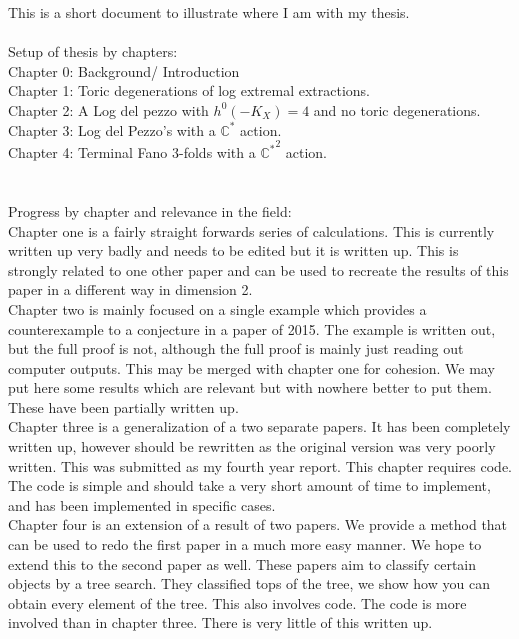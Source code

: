 \documentclass[11pt]{report}
\theoremstyle{definition}
\theoremstyle{definition}
\theoremstyle{definition}
\theoremstyle{definition}
\theoremstyle{definition}
\theoremstyle{definition}
\theoremstyle{definition}
\theoremstyle{definition}
\begin{document}
 

This is a short document to illustrate where I am with my thesis.
\\
\\
Setup of thesis by chapters:
\\
Chapter 0: Background/  Introduction \\
Chapter 1: Toric degenerations of log extremal extractions. \\
Chapter 2: A Log del pezzo with $h^0(-K_X) = 4$ and no toric degenerations. \\
Chapter 3: Log del Pezzo's with a $\mathbb{C}^*$ action. \\
Chapter 4: Terminal Fano 3-folds with a ${\mathbb{C}^*}^2$ action. \\
\\
\\
Progress by chapter and relevance in the field: 
\\
 Chapter one is a fairly straight forwards series of calculations. This is currently written up very badly and needs to be edited but it is written up. This is strongly related to one other paper and can be used to recreate the results of this paper in a different way in dimension 2.
\\
Chapter two is mainly focused on a single example which provides a counterexample to a conjecture in a paper of 2015. The example is written out, but the full proof is not, although the full proof is mainly just reading out computer outputs. This may be merged with chapter one for cohesion. We may put here some results which are relevant but with nowhere better to put them. These have been partially written up.
\\
Chapter three is a generalization of a two separate papers. It has been completely written up, however should be rewritten as the original version was very poorly written. This was submitted as my fourth year report. This chapter requires code. The code is simple and should take a very short amount of time to implement, and has been implemented in specific cases.
\\
Chapter four is an extension of a result of two papers. We provide a method that can be used to redo the first paper in a much more easy manner. We hope to extend this to the second paper as well. These papers aim to classify certain objects by a tree search. They classified tops of the tree, we show how you can obtain every element of the tree. This also involves code. The code is more involved than in chapter three. There is very little of this written up.
 
\end{document}
